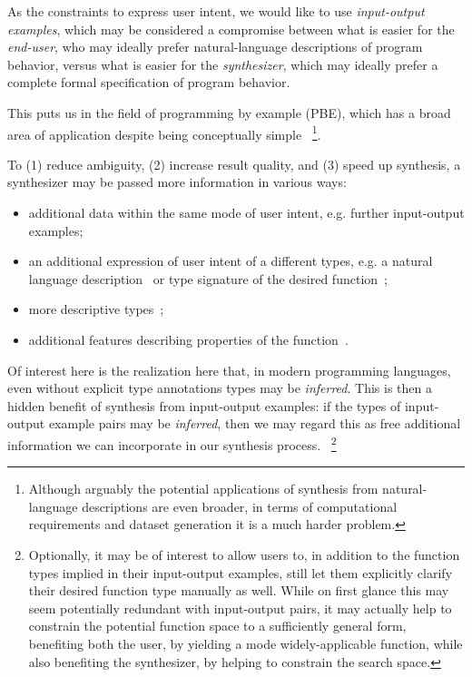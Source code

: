 \documentclass{article}
\begin{document}
As the constraints to express user intent, we would like to use \emph{input-output examples},
which may be considered a compromise between what is easier for the \emph{end-user},
who may ideally prefer natural-language descriptions of program behavior,
versus what is easier for the \emph{synthesizer},
which may ideally prefer a complete formal specification of program behavior.

This puts us in the field of programming by example (PBE),
which has a broad area of application despite being conceptually simple%
~\footnote{
    Although arguably the potential applications of synthesis from natural-language descriptions are even broader,
    in terms of computational requirements and dataset generation it is a much harder problem.
}.

To (1) reduce ambiguity, (2) increase result quality, and (3) speed up synthesis, a synthesizer may be passed more information in various ways:
\begin{itemize}
    \item additional data within the same mode of user intent, e.g. further input-output examples;
    \item an additional expression of user intent of a different types, e.g. a natural language description~\citep{polosukhin2018neural} or type signature of the desired function~\citep{myth};
    \item more descriptive types~\citep{synquid};
    \item additional features describing properties of the function~\citep{odena2020learning}.
\end{itemize}

Of interest here is the realization here that, in modern programming languages, even without explicit type annotations types may be \emph{inferred}.
This is then a hidden benefit of synthesis from input-output examples:
if the types of input-output example pairs may be \emph{inferred}, then we may regard this as free additional information we can incorporate in our synthesis process.%
~\footnote{
    Optionally, it may be of interest to allow users to,
    in addition to the function types implied in their input-output examples,
    still let them explicitly clarify their desired function type manually as well.
    While on first glance this may seem potentially redundant with input-output pairs,
    it may actually help to constrain the potential function space to a sufficiently general form,
    benefiting both the user,
    by yielding a mode widely-applicable function,
    while also benefiting the synthesizer,
    by helping to constrain the search space.
}
\end{document}
